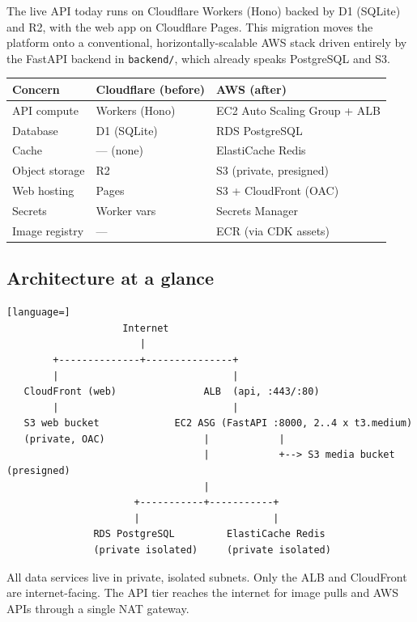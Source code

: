 \documentclass[11pt,a4paper]{article}
\begin{document}
The live API today runs on Cloudflare Workers (Hono) backed by D1 (SQLite) and
R2, with the web app on Cloudflare Pages. This migration moves the platform onto
a conventional, horizontally-scalable AWS stack driven entirely by the FastAPI
backend in \texttt{backend/}, which already speaks PostgreSQL and S3.

\begin{center}
\begin{tabular}{@{}lll@{}}
\toprule
\textbf{Concern} & \textbf{Cloudflare (before)} & \textbf{AWS (after)} \\
\midrule
API compute      & Workers (Hono)        & EC2 Auto Scaling Group + ALB \\
Database         & D1 (SQLite)           & RDS PostgreSQL \\
Cache            & --- (none)            & ElastiCache Redis \\
Object storage   & R2                    & S3 (private, presigned) \\
Web hosting      & Pages                 & S3 + CloudFront (OAC) \\
Secrets          & Worker vars           & Secrets Manager \\
Image registry   & ---                   & ECR (via CDK assets) \\
\bottomrule
\end{tabular}
\end{center}

\subsection{Architecture at a glance}

\begin{lstlisting}[language=]
                    Internet
                       |
        +--------------+---------------+
        |                              |
   CloudFront (web)               ALB  (api, :443/:80)
        |                              |
   S3 web bucket             EC2 ASG (FastAPI :8000, 2..4 x t3.medium)
   (private, OAC)                 |            |
                                  |            +--> S3 media bucket (presigned)
                                  |
                      +-----------+-----------+
                      |                       |
               RDS PostgreSQL         ElastiCache Redis
               (private isolated)     (private isolated)
\end{lstlisting}

All data services live in private, isolated subnets. Only the ALB and
CloudFront are internet-facing. The API tier reaches the internet for image
pulls and AWS APIs through a single NAT gateway.
\end{document}
